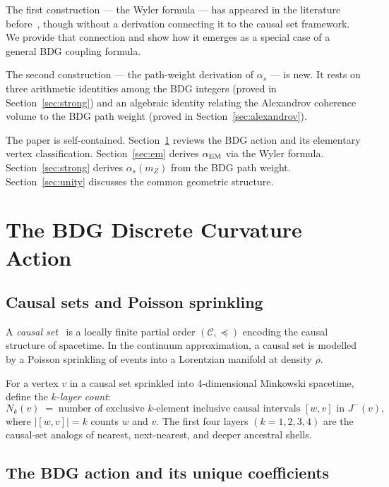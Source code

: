 \documentclass[12pt,a4paper]{article}
\theoremstyle{definition}
\begin{document}
The first construction — the Wyler formula — has appeared in the literature
before~\cite{Wyler1969,Wyler1971,Gilmore1973}, though without a derivation
connecting it to the causal set framework.  We provide that connection and
show how it emerges as a special case of a general BDG coupling formula.

The second construction — the path-weight derivation of $\alpha_s$ — is
new.  It rests on three arithmetic identities among the BDG integers (proved
in Section~\ref{sec:strong}) and an algebraic identity relating the
Alexandrov coherence volume to the BDG path weight (proved in
Section~\ref{sec:alexandrov}).

The paper is self-contained.  Section~\ref{sec:bdg} reviews the BDG
action and its elementary vertex classification.  Section~\ref{sec:em}
derives $\alpha_{\rm EM}$ via the Wyler formula.  Section~\ref{sec:strong}
derives $\alpha_s(m_Z)$ from the BDG path weight.  Section~\ref{sec:unity}
discusses the common geometric structure.

\section{The BDG Discrete Curvature Action}
\label{sec:bdg}

\subsection{Causal sets and Poisson sprinkling}

A \emph{causal set}~\cite{Bombelli1987} is a locally finite partial order
$(\mathcal{C}, \preceq)$ encoding the causal structure of spacetime.  In
the continuum approximation, a causal set is modelled by a Poisson
sprinkling of events into a Lorentzian manifold at density $\rho$.

For a vertex $v$ in a causal set sprinkled into 4-dimensional Minkowski
spacetime, define the \emph{$k$-layer count}:
\begin{equation}
  N_k(v) \;=\; \text{number of exclusive $k$-element inclusive causal
  intervals } [w,v] \text{ in } J^-(v),
\end{equation}
where $|[w,v]|=k$ counts $w$ and $v$.  The first four layers $(k=1,2,3,4)$
are the causal-set analogs of nearest, next-nearest, and deeper ancestral
shells.

\subsection{The BDG action and its unique coefficients}
\end{document}
